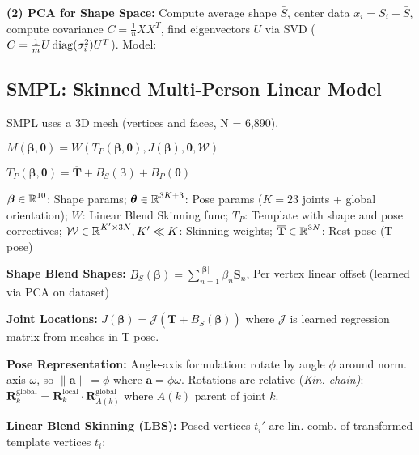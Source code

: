 \textbf{(2) PCA for Shape Space:} Compute average shape $\bar{S}$, center data $x_i = S_i - \bar{S}$, compute covariance {\footnotesize $C = \frac{1}{n}XX^T$}, find eigenvectors $U$ via SVD ({\footnotesize $C=\frac{1}{m}U\operatorname{diag}(\sigma_i^2)U^T$}). Model: 

\subsection{SMPL: {\small Skinned Multi-Person Linear Model}}

SMPL uses a 3D mesh (vertices and faces, N = 6,890).

\begin{highlightbox*}[gray!30]
$M(\boldsymbol{\beta}, \boldsymbol{\theta}) = W(T_P(\boldsymbol{\beta}, \boldsymbol{\theta}), J(\boldsymbol{\beta}), \boldsymbol{\theta}, \mathcal{W})$

$T_P(\boldsymbol{\beta}, \boldsymbol{\theta}) = \overline{\mathbf{T}} + B_S(\boldsymbol{\beta}) + B_P(\boldsymbol{\theta})$
\end{highlightbox*}

{\footnotesize
$\boldsymbol{\beta} \in \operatorname{\mathbb{R}}^{10}$: Shape params; $\boldsymbol{\theta} \in \operatorname{\mathbb{R}}^{3K+3}$: Pose params ($K=23$ joints + global orientation); $W$: Linear Blend Skinning func; $T_P$: Template with shape and pose correctives; $\mathcal{W} \in \operatorname{\mathbb{R}}^{K'\times3N}, K' \ll K$: Skinning weights; $\overline{\mathbf{T}} \in \operatorname{\mathbb{R}}^{3N}$: Rest pose (T-pose) 
}

\textbf{Shape Blend Shapes:} $B_S(\boldsymbol{\beta}) = \sum_{n=1}^{|\boldsymbol{\beta}|} \beta_n \mathbf{S}_n$, Per vertex linear offset (learned via PCA on dataset)

\textbf{Joint Locations:} $J(\boldsymbol{\beta}) = \mathcal{J}(\overline{\mathbf{T}} + B_S(\boldsymbol{\beta}))$ where $\mathcal{J}$ is learned regression matrix from meshes in T-pose.

\textbf{Pose Representation:} Angle-axis formulation: rotate by angle $\phi$ around norm. axis $\omega$, so $\|\mathbf{a}\| = \phi$ where $\mathbf{a} = \phi \omega$. Rotations are relative (\textit{Kin. chain)}: {\small$\mathbf{R}_k^{\text{global}} = \mathbf{R}_k^{\text{local}} \cdot \mathbf{R}_{A(k)}^{\text{global}}$} where $A(k)$ parent of joint $k$.

\textbf{Linear Blend Skinning (LBS):} Posed vertices $t_i'$ are lin. comb. of transformed template vertices $t_i$:

